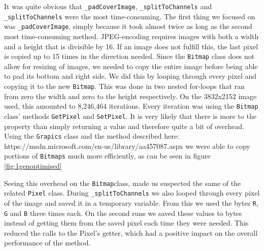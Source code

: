 It was quite obvious that \lstinline|_padCoverImage|, \lstinline|_splitToChannels| and \lstinline|_splitToChannels| were the most time-consuming.
The first thing we focused on was \lstinline|_padCoverImage|, simply because it took almost twice as long as the second most time-consuming method.
JPEG-encoding requires images with both a width and a height that is divisible by 16.
If an image does not fulfill this, the last pixel is copied up to 15 times in the direction needed.
Since the \lstinline|Bitmap| class does not allow for resizing of images, we needed to copy the entire image before being able to pad its bottom and right side.
We did this by looping through every pixel and copying it to the new \lstinline|Bitmap|.
This was done in two nested for-loops that ran from zero the width and zero to the height respectively.
On the 3832x2152 image used, this amounted to 8,246,464 iterations. 
Every iteration was using the \lstinline|Bitmap| class' methods \lstinline|GetPixel| and \lstinline|SetPixel|.
It is very likely that there is more to the property than simply returning a value and therefore quite a bit of overhead.
Using the \lstinline|Grapics| class and the method described here: https://msdn.microsoft.com/en-us/library/aa457087.aspx we were able to copy portions of \lstinline|Bitmaps| much more efficiently, as can be seen in figure \ref{fig:1genoptimised}

Seeing this overhead on the \lstinline|Bitmap|class, made us suspected the same of the related \lstinline|Pixel| class. 
During \lstinline|_splitToChannels| we also looped through every pixel of the image and saved it in a temporary variable. 
From this we used the bytes \lstinline|R|, \lstinline|G| and \lstinline|B| three times each. 
On the second runs we saved these values to bytes instead of getting them from the saved pixel each time they were needed.
This reduced the calls to the Pixel's getter, which had a positive impact on the overall performance of the method.

